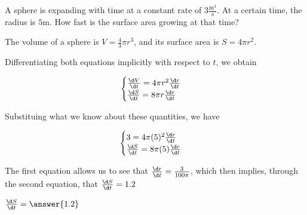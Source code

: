 \documentclass{ximera}
\author{Steven Gubkin}
\begin{document}
\begin{exercise}



A sphere is expanding with time at a constant rate of $3 \frac{\textrm{m}^3}{\textrm{s}}$.  At a certain time, the radius  is $5 \textrm{m}$.  How fast is the surface area growing at that time?

\begin{hint}
	The volume of a sphere is $V = \frac{4}{3} \pi r^3$, and its surface area is $S = 4 \pi r^2$.
\end{hint}

\begin{hint}
	Differentiating  both equations implicitly with respect to $t$, we obtain

\[
\begin{cases}
\frac{\d V}{\d t} = 4 \pi r^2 \frac{\d r}{\d t} \\
\frac{\d S}{\d t} = 8\pi r \frac{\d r}{\d t}
\end{cases}
\]
\end{hint}

\begin{hint}
	Substituing what we know about these quantities, we have

\[
\begin{cases}
3= 4 \pi (5)^2 \frac{\d r}{\d t} \\
\frac{\d S}{\d t} = 8\pi (5) \frac{\d r}{\d t}
\end{cases}
\]
\end{hint}

\begin{hint}
	The first equation allows us to see that $\frac{\d r}{\d t}  = \frac{3}{100 \pi}$, which then implies, through the second equation, that $\frac{\d S}{\d t} = 1.2$
\end{hint}

\begin{prompt}
	$\frac{\d S}{\d t} = \answer{1.2}$
\end{prompt}

\end{exercise}
\end{document}
